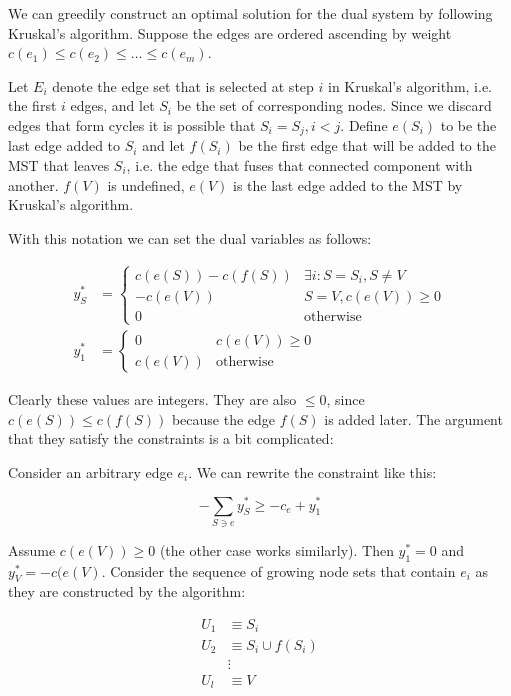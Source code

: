 We can greedily construct an optimal solution for the dual system by following Kruskal's algorithm. Suppose the edges are ordered ascending by weight $c(e_1)\leq c(e_2)\leq \ldots \leq c(e_m)$. 

Let $E_i$ denote the edge set that is selected at step $i$ in Kruskal's algorithm, i.e. the first $i$ edges, and let $S_i$ be the set of corresponding nodes. Since we discard edges that form cycles it is possible that $S_i=S_j, i<j$. Define $e(S_i)$ to be the last edge added to $S_i$ and let $f(S_i)$ be the first edge that will be added to the MST that leaves $S_i$, i.e. the edge that fuses that connected component with another. $f(V)$ is undefined, $e(V)$ is the last edge added to the MST by Kruskal's algorithm.

With this notation we can set the dual variables as follows:

\begin{align*}
y_S^* &= \begin{cases}
c(e(S)) - c(f(S)) & \exists i: S=S_i, S\neq V\\
-c(e(V)) 	& S=V, c(e(V)) \geq 0\\
0	& \text{otherwise}\end{cases}\\
y_1^* &= \begin{cases}
0 & c(e(V)) \geq 0\\
c(e(V)) & \text{otherwise}
\end{cases}
\end{align*}

Clearly these values are integers. They are also $\leq 0$, since $c(e(S)) \leq c(f(S))$ because the edge $f(S)$ is added later. The argument that they satisfy the constraints is a bit complicated:

Consider an arbitrary edge $e_i$. We can rewrite the constraint like this:

\[-\sum_{S\ni e} y_S^* \geq -c_e + y_1^*\]

Assume $c(e(V))\geq 0$ (the other case works similarly). Then $y_1^*=0$ and $y_V^*=-c(e(V)$. Consider the sequence of growing node sets that contain $e_i$ as they are constructed by the algorithm:

\begin{align*}
U_1 &\equiv S_i\\
U_2 &\equiv S_i \cup f(S_i)\\
&\vdots\\
U_l &\equiv V
\end{align*}

